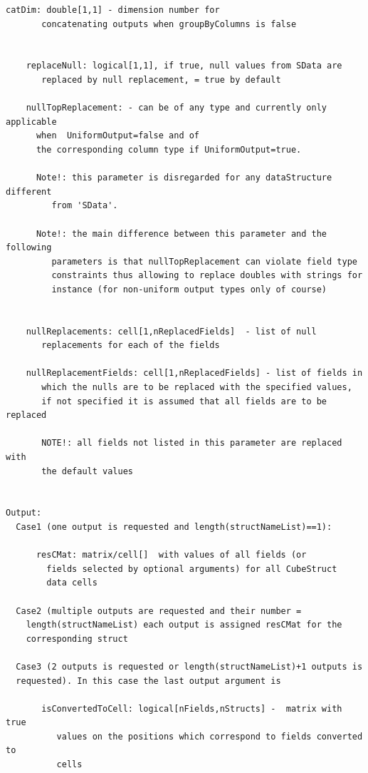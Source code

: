 \documentclass[letterpaper,10pt,english]{sphinxmanual}
\begin{document}
\begin{Verbatim}[commandchars=\\\{\}]
    catDim: double[1,1] - dimension number for
       concatenating outputs when groupByColumns is false


    replaceNull: logical[1,1], if true, null values from SData are
       replaced by null replacement, = true by default

    nullTopReplacement: - can be of any type and currently only applicable
      when  UniformOutput=false and of
      the corresponding column type if UniformOutput=true.

      Note!: this parameter is disregarded for any dataStructure different
         from 'SData'.

      Note!: the main difference between this parameter and the following
         parameters is that nullTopReplacement can violate field type
         constraints thus allowing to replace doubles with strings for
         instance (for non-uniform output types only of course)


    nullReplacements: cell[1,nReplacedFields]  - list of null
       replacements for each of the fields

    nullReplacementFields: cell[1,nReplacedFields] - list of fields in
       which the nulls are to be replaced with the specified values,
       if not specified it is assumed that all fields are to be replaced

       NOTE!: all fields not listed in this parameter are replaced with
       the default values


Output:
  Case1 (one output is requested and length(structNameList)==1):

      resCMat: matrix/cell[]  with values of all fields (or
        fields selected by optional arguments) for all CubeStruct
        data cells

  Case2 (multiple outputs are requested and their number =
    length(structNameList) each output is assigned resCMat for the
    corresponding struct

  Case3 (2 outputs is requested or length(structNameList)+1 outputs is
  requested). In this case the last output argument is

       isConvertedToCell: logical[nFields,nStructs] -  matrix with true
          values on the positions which correspond to fields converted to
          cells
\end{Verbatim}
\end{document}
